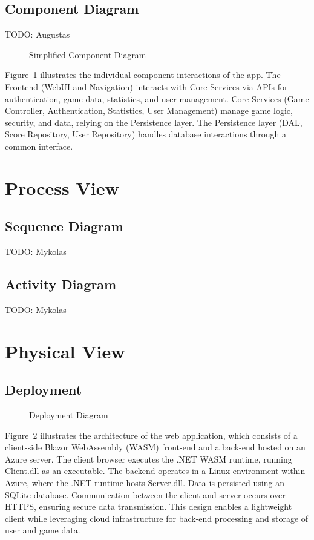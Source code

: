 \documentclass[11pt,a4paper]{article}
\newcommand{\inputdiagram}[1]{}
\newcommand{\textwidthdiagram}[2][1]{%
  \resizebox{#1\textwidth}{!}{\inputdiagram{#2}}%
}
\begin{document}
\subsection{Component Diagram}
TODO: Augustas
\begin{figure}[H]
    \centering
    \textwidthdiagram{simplified_component_diagram.latex}
    \caption{Simplified Component Diagram}
    \label{fig:simp_component_diagram}
\end{figure}

Figure~\ref{fig:simp_component_diagram} illustrates the individual component interactions of the app. The Frontend (WebUI and Navigation) interacts with Core Services via APIs for authentication, game data, statistics, and user management. Core Services (Game Controller, Authentication, Statistics, User Management) manage game logic, security, and data, relying on the Persistence layer. The Persistence layer (DAL, Score Repository, User Repository) handles database interactions through a common interface.

\section{Process View}

\subsection{Sequence Diagram}
TODO: Mykolas
\subsection{Activity Diagram}
TODO: Mykolas

\section{Physical View}
\subsection{Deployment}
\begin{figure}[H]
    \centering
    \textwidthdiagram[0.8]{deployment_diagram.tex}
    \caption{Deployment Diagram}
    \label{fig:deployment_diagram}
\end{figure}

Figure~\ref{fig:deployment_diagram} illustrates the architecture of the web application,
which consists of a client-side Blazor WebAssembly (WASM) front-end and a back-end hosted on an Azure server. The client browser executes the .NET WASM
runtime, running Client.dll as an executable. The backend operates in a Linux
environment within Azure, where the .NET runtime hosts Server.dll. Data is
persisted using an SQLite database. Communication between the client and
server occurs over HTTPS, ensuring secure data transmission. This design
enables a lightweight client while leveraging cloud infrastructure for
back-end processing and storage of user and game data.
\end{document}
